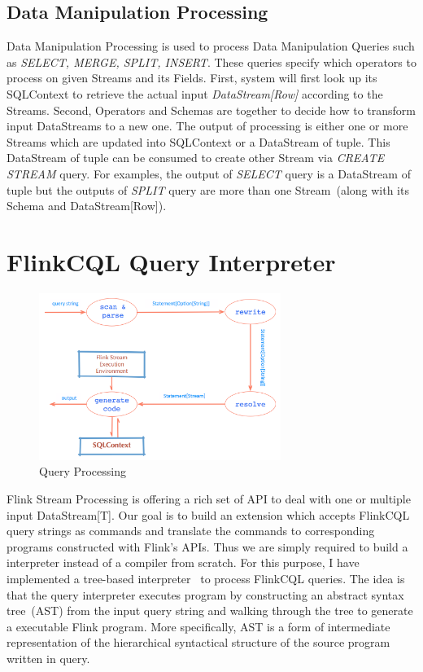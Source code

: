 \subsection{Data Manipulation Processing}
Data Manipulation Processing is used to process Data Manipulation Queries such as \textit{SELECT, MERGE, SPLIT, INSERT}. These queries specify which operators to process on given Streams and its Fields. First, system will first look up its SQLContext to retrieve the actual input \textit{DataStream[Row]} according to the Streams. Second, Operators and Schemas are together to decide how to transform input DataStreams to a new one. The output of processing is either one or more Streams which are updated into SQLContext or a DataStream of tuple. This DataStream of tuple can be consumed to create other Stream via \textit{CREATE STREAM} query. For examples, the output of \textit{SELECT} query is a DataStream of tuple but the outputs of \textit{SPLIT} query are more than one Stream~(along with its Schema and DataStream[Row]).

\section{FlinkCQL Query Interpreter}
\begin{figure}[h!] 
\centering    
\includegraphics[width=0.7\textwidth]{QueryProcessing}
\caption{Query Processing}
\label{fig:QueryProcessing}
\end{figure}


Flink Stream Processing is offering a rich set of API to deal with one or  multiple input DataStream[T]. Our goal is to build an extension which accepts FlinkCQL query strings as commands and translate the commands to  corresponding programs constructed with Flink's APIs. Thus we are simply required to build a interpreter instead of a compiler from scratch. For this purpose, I have implemented a tree-based interpreter~\citep{Parr:2009} to process FlinkCQL queries. The idea is that the query interpreter executes program by constructing an abstract syntax tree~(AST) from the input query string and walking through the tree to generate a executable Flink program. More specifically, AST is a form of intermediate representation of the hierarchical syntactical structure of the source program written in query.  
	


